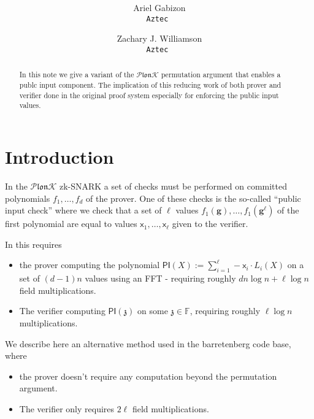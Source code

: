 \documentclass[11pt]{article} %
\title{ \bf \papertitle \\[0.72cm]}
\author{ Ariel Gabizon\\ \tt{Aztec}  \and Zachary J. Williamson\\ \tt{Aztec} }
\newcommand{\plonk}{\ensuremath{\mathcal{P} \mathfrak{lon}\mathcal{K}}\xspace}
\newcommand{\F}{\ensuremath{\mathbb F}\xspace}
\newcommand{\chalpoint}{\ensuremath{\mathfrak{z}}\xspace}
\newcommand{\defeq}{:=}
\newcommand{\inp}{\ensuremath{\mathsf{x}}\xspace}
\newcommand{\hgen}{\ensuremath{\mathbf{g}}\xspace}
\newcommand{\pubinppoly}{\ensuremath{\mathsf{PI}}\xspace}
\begin{document}
    \maketitle

\begin{abstract}
	In this note we give a variant of the \plonk permutation argument\cite{plonk} that enables a publc input component. The implication of this reducing work of both prover and verifier done in the original proof system especially for enforcing the public input values. 
	
\end{abstract}

\section{Introduction}
In the \plonk zk-SNARK \cite{plonk} a set of checks must be performed on committed polynomials $f_1,\ldots,f_d$ of the prover.
One of these checks is the so-called ``public input check''
where we check that a set of $\ell$ values $f_1(\hgen),\ldots,f_1(\hgen^{\ell})$ of the first polynomial are equal to values $\inp_1,\ldots,\inp_{\ell}$ given to the verifier.

In \cite{plonk} this requires 
\begin{itemize}
 \item 
the prover computing the polynomial $\pubinppoly(X)\defeq \sum_ {i=1}^{\ell} -\inp_i \cdot L_i(X)$ on a set of $(d-1)n$ values using an FFT - requiring roughly  $dn\log n+\ell\log n$ field multiplications.
\item The verifier computing $\pubinppoly(\chalpoint)$ on some $\chalpoint\in\F$, requiring roughly $\ell \log n$ multiplications.
\end{itemize}
We describe here an alternative method used in the barretenberg code base, where
\begin{itemize}
 \item 
the prover doesn't require any computation beyond the permutation argument. 
\item The verifier only requires $2\ell$ field multiplications. 
\end{itemize}
\end{document}
